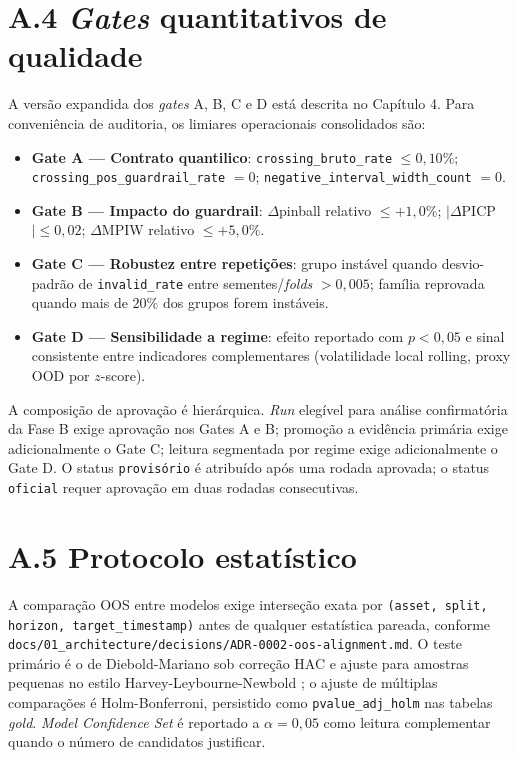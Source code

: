 \section*{A.4 \textit{Gates} quantitativos de qualidade}

A versão expandida dos \textit{gates} A, B, C e D está descrita no Capítulo 4. Para conveniência de auditoria, os limiares operacionais consolidados são:

\begin{itemize}
    \item \textbf{Gate A — Contrato quantilico}: \texttt{crossing\_bruto\_rate} \(\leq 0{,}10\%\); \texttt{crossing\_pos\_guardrail\_rate} \(= 0\); \texttt{negative\_interval\_width\_count} \(= 0\).
    \item \textbf{Gate B — Impacto do guardrail}: \(\Delta\)pinball relativo \(\leq +1{,}0\%\); \(|\Delta\)PICP\(| \leq 0{,}02\); \(\Delta\)MPIW relativo \(\leq +5{,}0\%\).
    \item \textbf{Gate C — Robustez entre repetições}: grupo instável quando desvio-padrão de \texttt{invalid\_rate} entre sementes/\textit{folds} \(> 0{,}005\); família reprovada quando mais de \(20\%\) dos grupos forem instáveis.
    \item \textbf{Gate D — Sensibilidade a regime}: efeito reportado com \(p < 0{,}05\) e sinal consistente entre indicadores complementares (volatilidade local rolling, proxy OOD por \(z\)-score).
\end{itemize}

A composição de aprovação é hierárquica. \textit{Run} elegível para análise confirmatória da Fase B exige aprovação nos Gates A e B; promoção a evidência primária exige adicionalmente o Gate C; leitura segmentada por regime exige adicionalmente o Gate D. O status \texttt{provisório} é atribuído após uma rodada aprovada; o status \texttt{oficial} requer aprovação em duas rodadas consecutivas.

\section*{A.5 Protocolo estatístico}

A comparação OOS entre modelos exige interseção exata por \texttt{(asset, split, horizon, target\_timestamp)} antes de qualquer estatística pareada, conforme \texttt{docs/01\_architecture/decisions/ADR-0002-oos-alignment.md}. O teste primário é o de Diebold-Mariano \cite{DIEBOLDMARIANO1995} sob correção HAC e ajuste para amostras pequenas no estilo Harvey-Leybourne-Newbold \cite{HARVEY1997}; o ajuste de múltiplas comparações é Holm-Bonferroni, persistido como \texttt{pvalue\_adj\_holm} nas tabelas \textit{gold}. \textit{Model Confidence Set} \cite{HANSEN2011MCS} é reportado a \(\alpha = 0{,}05\) como leitura complementar quando o número de candidatos justificar.

